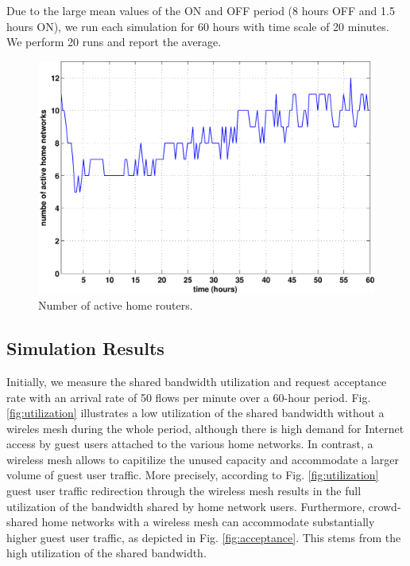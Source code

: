 Due to the large mean values of the ON and OFF period (8 hours OFF and 1.5 hours ON), we run each simulation for 60 hours with time scale of 20 minutes. We perform 20 runs and report the average. 


\begin{figure}[h]
\begin{center}
\includegraphics[width=1\linewidth]{../../results/simulation/on_routers2.pdf}  
\caption{Number of active home routers.}
\label{fig:active_routers}
\end{center}
\end{figure}


\subsection{Simulation Results}
\label{evaluation:results}

Initially, we measure the shared bandwidth utilization and request acceptance rate with an arrival rate of 50 flows per minute over a 60-hour period. Fig. \ref{fig:utilization} illustrates a low utilization of the shared bandwidth without a wireles mesh during the whole period, although there is high demand for Internet access by guest users attached to the various home networks. In contrast, a wireless mesh allows to capitilize the unused capacity and accommodate a larger volume of guest user traffic. More precisely, according to Fig. \ref{fig:utilization} guest user traffic redirection through the wireless mesh results in the full utilization of the bandwidth shared by home network users. Furthermore, crowd-shared home networks with a wireless mesh can accommodate substantially higher guest user traffic, as depicted in Fig. \ref{fig:acceptance}. This stems from the high utilization of the shared bandwidth. 

